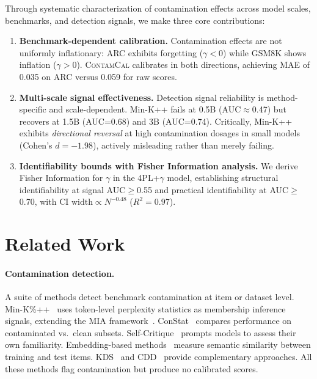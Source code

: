 \documentclass[11pt,a4paper]{article}
\newcommand{\contamcal}{\textsc{ContamCal}}
\begin{document}
Through systematic characterization of contamination effects across model scales, benchmarks, and detection signals, we make three core contributions:

\begin{enumerate}
\item \textbf{Benchmark-dependent calibration.} Contamination effects are not uniformly inflationary: ARC exhibits forgetting ($\gamma<0$) while GSM8K shows inflation ($\gamma>0$). \contamcal{} calibrates in both directions, achieving MAE of 0.035 on ARC versus 0.059 for raw scores.

\item \textbf{Multi-scale signal effectiveness.} Detection signal reliability is method-specific and scale-dependent. Min-K++ fails at 0.5B (AUC$\approx$0.47) but recovers at 1.5B (AUC=0.68) and 3B (AUC=0.74). Critically, Min-K++ exhibits \emph{directional reversal} at high contamination dosages in small models (Cohen's $d=-1.98$), actively misleading rather than merely failing.

\item \textbf{Identifiability bounds with Fisher Information analysis.} We derive Fisher Information for $\gamma$ in the 4PL+$\gamma$ model, establishing structural identifiability at signal AUC$\geq$0.55 and practical identifiability at AUC$\geq$0.70, with $\text{CI width} \propto N^{-0.48}$ ($R^2=0.97$).
\end{enumerate}

\section{Related Work}
\label{sec:related}

\paragraph{Contamination detection.}
A suite of methods detect benchmark contamination at item or dataset level. Min-K\%++~\citep{zhang2024minkpp} uses token-level perplexity statistics as membership inference signals, extending the MIA framework~\citep{shokri2017membership, carlini2022extracting}. ConStat~\citep{dekoninck2024constat} compares performance on contaminated vs.\ clean subsets. Self-Critique~\citep{weller2024selfcritique} prompts models to assess their own familiarity. Embedding-based methods~\citep{golchin2024time} measure semantic similarity between training and test items. KDS~\citep{dong2024kds} and CDD~\citep{shi2024cdd} provide complementary approaches. All these methods flag contamination but produce no calibrated scores.
\end{document}
